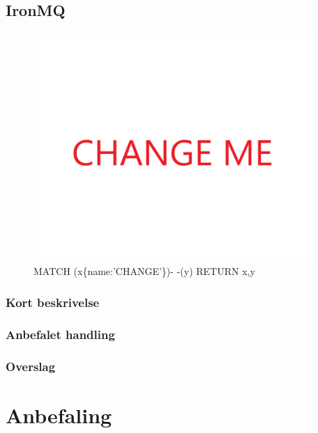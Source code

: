 \documentclass{article}
\begin{document}
\subsection{IronMQ}
\begin{figure}[h]
\includegraphics[width=300pt]{CHANGE.PNG}
\caption{MATCH (x\{name:'CHANGE'\})- -(y) RETURN x,y}
\end{figure}
\subsubsection{Kort beskrivelse}
\subsubsection{Anbefalet handling}
\subsubsection{Overslag}



\section{Anbefaling}

\end{document}
